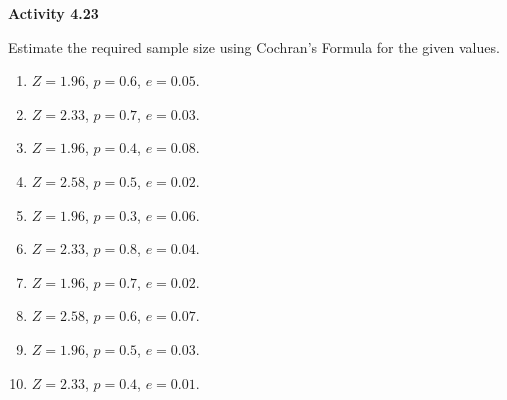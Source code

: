 \vspace{0.3ex}
\noindent\textbf{Activity 4.23}

\vspace{0.2ex}

Estimate the required sample size using Cochran’s Formula for the given values. 
\begin{multicols}{2}
\begin{enumerate}
    \item \(Z = 1.96\), \(p = 0.6\), \(e = 0.05\).
    \item \(Z = 2.33\), \(p = 0.7\), \(e = 0.03\).
    \item \(Z = 1.96\), \(p = 0.4\), \(e = 0.08\).
    \item \(Z = 2.58\), \(p = 0.5\), \(e = 0.02\).
    \item \(Z = 1.96\), \(p = 0.3\), \(e = 0.06\).
    \item \(Z = 2.33\), \(p = 0.8\), \(e = 0.04\).
    \item \(Z = 1.96\), \(p = 0.7\), \(e = 0.02\).
    \item \(Z = 2.58\), \(p = 0.6\), \(e = 0.07\).
    \item \(Z = 1.96\), \(p = 0.5\), \(e = 0.03\).
    \item \(Z = 2.33\), \(p = 0.4\), \(e = 0.01\).
\end{enumerate}
\end{multicols}

